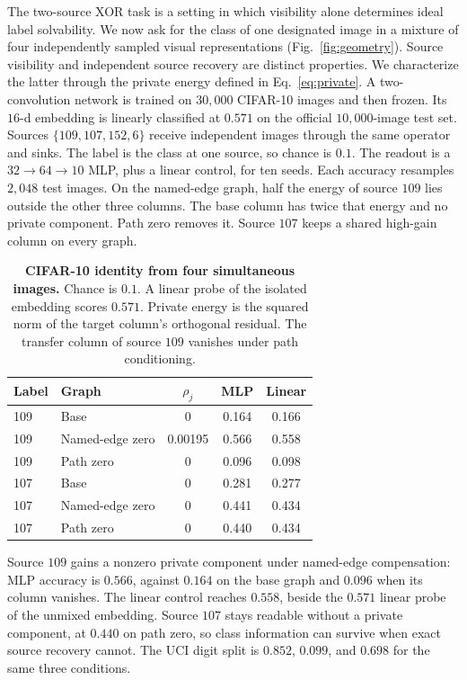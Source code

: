 The two-source XOR task is a setting in which visibility alone determines
ideal label solvability. We now ask for the class of one designated image
in a mixture of four independently sampled visual representations
(Fig.~\ref{fig:geometry}). Source visibility and independent source recovery are distinct properties.
We characterize the latter through the private energy defined in
Eq.~\eqref{eq:private}.
A two-convolution network is trained on $30{,}000$ CIFAR-10 images and then
frozen. Its $16$-d embedding is linearly classified at $0.571$ on the official
$10{,}000$-image test set. Sources $\{109,107,152,6\}$ receive independent
images through the same operator and sinks. The label is the class at one
source, so chance is $0.1$. The readout is a $32\!\to\!64\!\to\!10$ MLP, plus
a linear control, for ten seeds. Each accuracy resamples $2{,}048$ test
images. On the named-edge graph, half the energy of source $109$ lies outside
the other three columns. The base column has twice that energy and no private
component. Path zero removes it. Source $107$ keeps a shared high-gain column
on every graph.

\begin{table}[t]
\centering
\caption{\textbf{CIFAR-10 identity from four simultaneous images.} Chance is
$0.1$. A linear probe of the isolated embedding scores $0.571$. Private energy
is the squared norm of the target column's orthogonal residual. The transfer
column of source $109$ vanishes under path conditioning.}
\label{tab:population}
\small
\setlength{\tabcolsep}{4pt}
\begin{tabular}{@{}llccc@{}}
\toprule
Label & Graph & $\rho_j$ & MLP & Linear \\
\midrule
109 & Base & 0 & 0.164 & 0.166 \\
109 & Named-edge zero & 0.00195 & 0.566 & 0.558 \\
109 & Path zero & 0 & 0.096 & 0.098 \\
107 & Base & 0 & 0.281 & 0.277 \\
107 & Named-edge zero & 0 & 0.441 & 0.434 \\
107 & Path zero & 0 & 0.440 & 0.434 \\
\bottomrule
\end{tabular}
\end{table}

Source $109$ gains a nonzero private component under named-edge compensation:
MLP accuracy is $0.566$, against $0.164$ on the base graph and $0.096$ when
its column vanishes. The linear control reaches $0.558$, beside the $0.571$
linear probe of the unmixed embedding. Source $107$ stays readable without a
private component, at $0.440$ on path zero, so class information can survive
when exact source recovery cannot. The UCI digit split is $0.852$, $0.099$,
and $0.698$ for the same three conditions.

